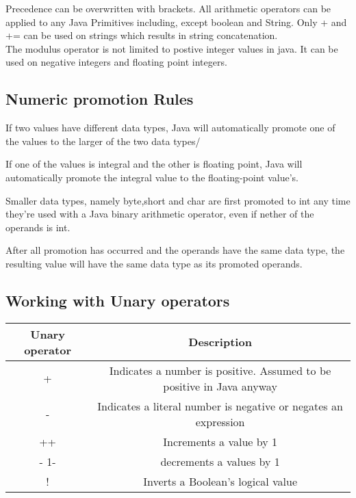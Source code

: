 \documentclass[a4paper]{report}   %
\begin{document}
Precedence can be overwritten with brackets. All arithmetic operators can be applied to any Java Primitives including, except boolean and String. Only + and += can be used on strings which results in string concatenation.\\ The modulus operator is not limited to postive integer values in java. It can be used on negative integers and floating point integers. 

\subsection{Numeric promotion Rules}
\begin{list}{•}{•}
	\item If two values have different data types, Java will automatically promote one of the values to the larger of the two data types/
	\item If one of the values is integral and the other is floating point, Java will automatically promote the integral value to the floating-point value's.
	\item Smaller data types, namely byte,short and char are first promoted to int any time they're used with a Java binary arithmetic operator, even if nether of the operands is int.
	\item After all promotion has occurred and the operands have the same data type, the resulting value will have the same data type as its promoted operands.
\end{list}
\subsection{Working with Unary operators}

\begin{center}
\begin{tabular}{| c | c |}
 \hline
 Unary operator & Description\\
 \hline
 + & Indicates a number is positive. Assumed to be positive in Java anyway\\
 - & Indicates a literal number is negative or negates an expression\\
 ++ & Increments a value by 1\\
 - 1- & decrements a values by 1\\
 ! & Inverts a Boolean's logical value\\
 \hline
\end{tabular}
\end{center}
\end{document}
